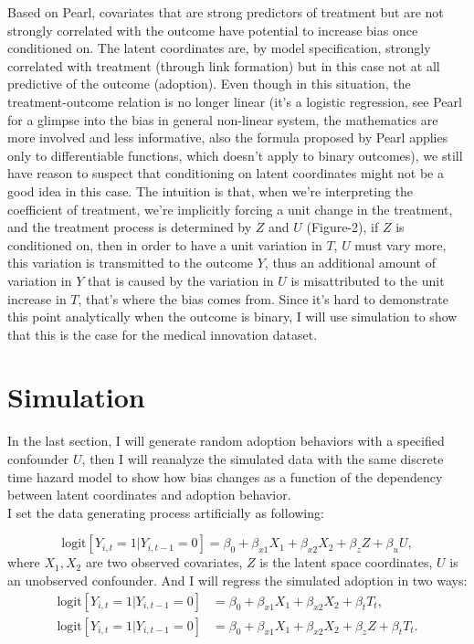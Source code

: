 \documentclass[11pt]{article}
\begin{document}
Based on Pearl, covariates that are strong predictors of treatment but are not strongly correlated with the outcome have potential to increase bias once conditioned on. The latent coordinates are, by model specification, strongly correlated with treatment (through link formation) but in this case not at all predictive of the outcome (adoption). Even though in this situation, the treatment-outcome relation is no longer linear (it's a logistic regression, see Pearl for a glimpse into the bias in general non-linear system, the mathematics are more involved and less informative, also the formula proposed by Pearl applies only to differentiable functions, which doesn't apply to binary outcomes), we still have reason to suspect that conditioning on latent coordinates might not be a good idea in this case. The intuition is that, when we're interpreting the coefficient of treatment, we're implicitly forcing a unit change in the treatment, and the treatment process is determined by $Z$ and $U$ (Figure-2), if $Z$ is conditioned on, then in order to have a unit variation in $T$, $U$ must vary more, this variation is transmitted to the outcome $Y$, thus an additional amount of variation in $Y$ that is caused by the variation in $U$ is misattributed to the unit increase in $T$, that's where the bias comes from. Since it's hard to demonstrate this point analytically when the outcome is binary, I will use simulation to show that this is the case for the medical innovation dataset.\\



\section{Simulation}
In the last section, I will generate random adoption behaviors with a specified confounder $U$, then I will reanalyze the simulated data with the same discrete time hazard model to show how bias changes as a function of the dependency between latent coordinates and adoption behavior.\\

I set the data generating process artificially as following:

$$\text{logit}[Y_{i,t}=1|Y_{i,t-1}=0] = \beta_0 + \beta_{x1} X_1 + \beta_{x2} X_2 + \beta_z Z + \beta_u U,$$
where $X_1,X_2$ are two observed covariates, $Z$ is the latent space coordinates, $U$ is an unobserved confounder. And I will regress the simulated adoption in two ways:
\begin{align*}
\text{logit}[Y_{i,t}=1|Y_{i,t-1}=0] &= \beta_0 + \beta_{x1} X_1 + \beta_{x2} X_2 + \beta_t T_t,\\
\text{logit}[Y_{i,t}=1|Y_{i,t-1}=0] &= \beta_0 + \beta_{x1} X_1 + \beta_{x2} X_2 + \beta_z Z + \beta_t T_t.
\end{align*}
\end{document}
